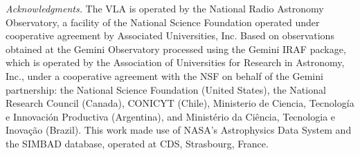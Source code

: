 \documentclass[twocolumn, times]{aastex6}
\begin{document}
\acknowledgments

\textit{Acknowledgments.} The VLA is operated by the National Radio Astronomy
Observatory, a facility of the National Science Foundation operated under
cooperative agreement by Associated Universities, Inc. Based on observations
obtained at the Gemini Observatory processed using the Gemini IRAF package,
which is operated by the Association of Universities for Research in
Astronomy, Inc., under a cooperative agreement with the NSF on behalf of the
Gemini partnership: the National Science Foundation (United States), the
National Research Council (Canada), CONICYT (Chile), Ministerio de Ciencia,
Tecnolog\'{i}a e Innovaci\'{o}n Productiva (Argentina), and Minist\'{e}rio da
Ci\^{e}ncia, Tecnologia e Inova\c{c}\~{a}o (Brazil). This work made use of
NASA's Astrophysics Data System and the SIMBAD database, operated at CDS,
Strasbourg, France.



{}
\end{document}
